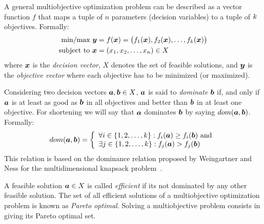 A general multiobjective optimization problem can be described as a vector
function $f$ that maps a tuple of $n$ parameters (decision variables) to a tuple
of $k$ objectives.
Formally:
\begin{align*}
  \text{min/max} ~ \boldsymbol{y} &= f(\boldsymbol{x}) = 
    \big(f_1(\boldsymbol{x})
    ,f_2(\boldsymbol{x})
    ,\ldots
    ,f_{k}(\boldsymbol{x})\big) \\
  \text{subject to} ~ \boldsymbol{x} & = (x_1, x_2, \ldots, x_n) \in X
\end{align*}
where $\boldsymbol{x}$ is the \emph{decision vector}, $X$ denotes the set
of feasible solutions, and $\boldsymbol{y}$ is the \emph{objective vector} where
each objective has to be minimized (or maximized).

Considering two decision vectors $\boldsymbol{a}, \boldsymbol{b} \in X$, $\boldsymbol{a}$ is said to
\emph{dominate} $\boldsymbol{b}$ if, and only if $\boldsymbol{a}$ is at least as good as $\boldsymbol{b}$
in all objectives and better than $\boldsymbol{b}$ in at least one objective.
For shortening we will say that $\boldsymbol{a}$ dominates $\boldsymbol{b}$ by saying $dom(\boldsymbol{a}, \boldsymbol{b})$.
Formally:
\begin{displaymath}
    dom(\boldsymbol{a}, \boldsymbol{b}) = \left\{
      \begin{array}{l}
          \forall i \in \{1, 2, \ldots, k\}: f_i(\boldsymbol{a}) \geq f_i(\boldsymbol{b}) ~\text{and}\\
          \exists j \in \{1, 2, \ldots, k\}: f_j(\boldsymbol{a}) > f_j(\boldsymbol{b})
  \end{array} \right.
\end{displaymath}
This relation is based on the dominance relation proposed by Weingartner and
Ness for the multidimensional knapsack problem~\cite{weingartner1967methods}.

A feasible solution $\boldsymbol{a} \in X$ is called \emph{efficient} %
if its not dominated by any other feasible solution.
The set of all efficient solutions of a multiobjective optimization problem is
known as \emph{Pareto optimal}.
Solving a multiobjective problem consists in giving its Pareto optimal set.

